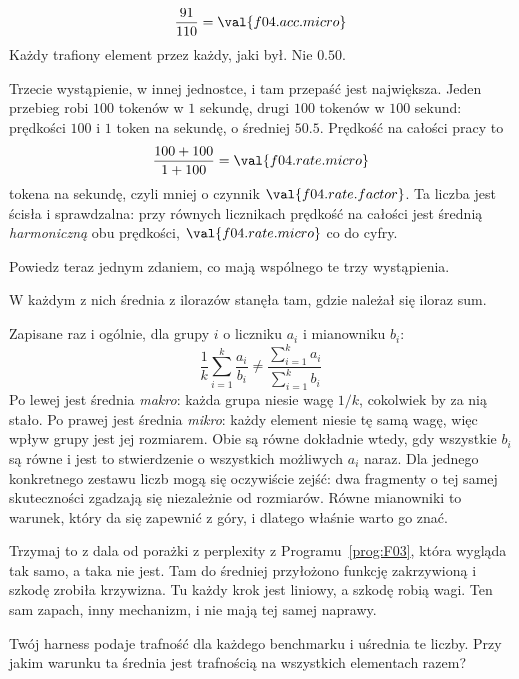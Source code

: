 \begin{fr}
\begin{ansblock}
\[ \frac{91}{110} = \val{f04.acc.micro} \]
Każdy trafiony element przez każdy, jaki był. Nie $\num{0.50}$.
\end{ansblock}

Trzecie wystąpienie, w innej jednostce, i tam przepaść jest największa. Jeden
przebieg robi $100$ tokenów w $1$ sekundę, drugi $100$ tokenów w $100$ sekund:
prędkości $100$ i $1$ token na sekundę, o średniej $\num{50.5}$. Prędkość na
całości pracy to
\[ \frac{100 + 100}{1 + 100} = \val{f04.rate.micro} \]
tokena na sekundę, czyli mniej o czynnik $\val{f04.rate.factor}$. Ta liczba
jest ścisła i sprawdzalna: przy równych licznikach prędkość na całości jest
średnią \emph{harmoniczną} obu prędkości, $\val{f04.rate.micro}$ co do cyfry.

Powiedz teraz jednym zdaniem, co mają wspólnego te trzy wystąpienia.
\dotline
\nextframe
\end{fr}

\begin{fr}
\begin{ansblock}
W każdym z nich średnia z ilorazów stanęła tam, gdzie należał się iloraz sum.
\end{ansblock}

Zapisane raz i ogólnie, dla grupy $i$ o liczniku $a_i$ i mianowniku $b_i$:
\[ \frac{1}{k}\sum_{i=1}^{k} \frac{a_i}{b_i} \ne
   \frac{\sum_{i=1}^{k} a_i}{\sum_{i=1}^{k} b_i} \]
Po lewej jest średnia \emph{makro}: każda grupa niesie wagę $1/k$, cokolwiek
by za nią stało. Po prawej jest średnia \emph{mikro}: każdy element niesie tę
samą wagę, więc wpływ grupy jest jej rozmiarem. Obie są równe dokładnie wtedy,
gdy wszystkie $b_i$ są równe \dash{} i jest to stwierdzenie o wszystkich
możliwych $a_i$ naraz. Dla jednego konkretnego zestawu liczb mogą się oczywiście
zejść: dwa fragmenty o tej samej skuteczności zgadzają się niezależnie od
rozmiarów. Równe mianowniki to warunek, który da się zapewnić z góry, i dlatego
właśnie warto go znać.

Trzymaj to z dala od porażki z perplexity z Programu~\ref{prog:F03}, która
wygląda tak samo, a taka nie jest. Tam do średniej przyłożono funkcję
zakrzywioną i szkodę zrobiła krzywizna. Tu każdy krok jest liniowy, a szkodę
robią wagi. Ten sam zapach, inny mechanizm, i nie mają tej samej naprawy.

\yourturn
Twój harness podaje trafność dla każdego benchmarku i uśrednia te
liczby. Przy jakim warunku ta średnia jest trafnością na wszystkich elementach
razem?
\dotline
\nextframe
\end{fr}


